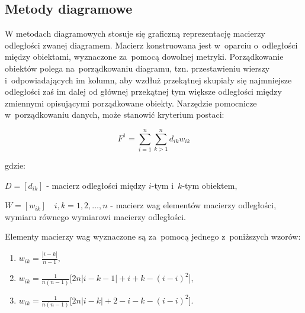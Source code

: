 \documentclass[12pt,a4paper]{report}
\begin{document}
\subsection{Metody diagramowe}


W metodach diagramowych stosuje się graficzną reprezentację macierzy odległości zwanej diagramem. Macierz konstruowana jest w~oparciu o~odległości między obiektami, wyznaczone za~pomocą dowolnej metryki. Porządkowanie obiektów polega na~porządkowaniu diagramu, tzn. przestawieniu wierszy i~odpowiadających im kolumn, aby wzdłuż przekątnej skupiały się najmniejsze odległości zaś im dalej od głównej przekątnej tym większe odległości między zmiennymi opisującymi porządkowane obiekty.  %
Narzędzie pomocnicze w~porządkowaniu danych, może stanowić kryterium postaci:


$$
F^1= \sum_{i=1}^{n} \sum_{k>1}^{n} d_{ik}w_{ik}
$$

gdzie:

$D=[d_{ik}]$ - macierz odległości między $i$-tym i~$k$-tym obiektem,
 
$W=[w_{ik}] \quad i,k=1, 2, \ldots, n$ - macierz wag elementów macierzy odległości, wymiaru równego wymiarowi macierzy odległości.
 

Elementy macierzy wag wyznaczone są za~pomocą jednego z~poniższych wzorów:
\begin{enumerate}[label=(\alph*)]
\item $w_{ik}=\frac{| i-k |}{n-1}, \qquad$
\item $w_{ik}=\frac{1}{n(n-1)}\lbrack{2n|i-k-1|+i+k-(i-i)^2\rbrack},$
\item $w_{ik}=\frac{1}{n(n-1)}\lbrack{2n|i-k|+2-i-k-(i-i)^2\rbrack}.$
\end{enumerate}
%
% 
\end{document}
